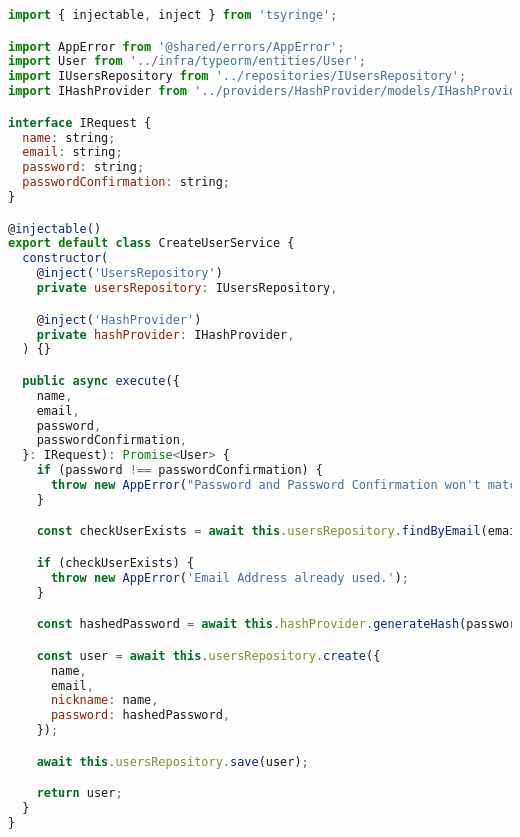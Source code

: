 \begin{lstlisting}[language=JavaScript, caption={CreateUserService.ts},captionpos=b, label=alg:createuserservice]
import { injectable, inject } from 'tsyringe';

import AppError from '@shared/errors/AppError';
import User from '../infra/typeorm/entities/User';
import IUsersRepository from '../repositories/IUsersRepository';
import IHashProvider from '../providers/HashProvider/models/IHashProvider';

interface IRequest {
  name: string;
  email: string;
  password: string;
  passwordConfirmation: string;
}

@injectable()
export default class CreateUserService {
  constructor(
    @inject('UsersRepository')
    private usersRepository: IUsersRepository,

    @inject('HashProvider')
    private hashProvider: IHashProvider,
  ) {}

  public async execute({
    name,
    email,
    password,
    passwordConfirmation,
  }: IRequest): Promise<User> {
    if (password !== passwordConfirmation) {
      throw new AppError("Password and Password Confirmation won't match");
    }

    const checkUserExists = await this.usersRepository.findByEmail(email);

    if (checkUserExists) {
      throw new AppError('Email Address already used.');
    }

    const hashedPassword = await this.hashProvider.generateHash(password);

    const user = await this.usersRepository.create({
      name,
      email,
      nickname: name,
      password: hashedPassword,
    });

    await this.usersRepository.save(user);

    return user;
  }
}
\end{lstlisting}